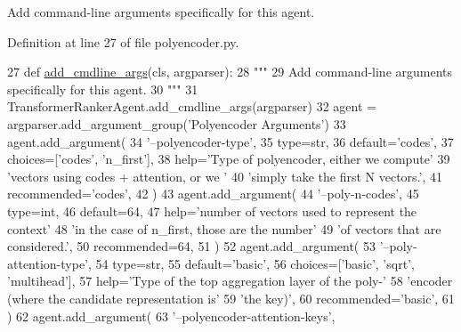 \begin{DoxyVerb}Add command-line arguments specifically for this agent.
\end{DoxyVerb}
 

Definition at line 27 of file polyencoder.\+py.


\begin{DoxyCode}
27     \textcolor{keyword}{def }\hyperlink{namespaceparlai_1_1agents_1_1drqa_1_1config_a62fdd5554f1da6be0cba185271058320}{add\_cmdline\_args}(cls, argparser):
28         \textcolor{stringliteral}{"""}
29 \textcolor{stringliteral}{        Add command-line arguments specifically for this agent.}
30 \textcolor{stringliteral}{        """}
31         TransformerRankerAgent.add\_cmdline\_args(argparser)
32         agent = argparser.add\_argument\_group(\textcolor{stringliteral}{'Polyencoder Arguments'})
33         agent.add\_argument(
34             \textcolor{stringliteral}{'--polyencoder-type'},
35             type=str,
36             default=\textcolor{stringliteral}{'codes'},
37             choices=[\textcolor{stringliteral}{'codes'}, \textcolor{stringliteral}{'n\_first'}],
38             help=\textcolor{stringliteral}{'Type of polyencoder, either we compute'}
39             \textcolor{stringliteral}{'vectors using codes + attention, or we '}
40             \textcolor{stringliteral}{'simply take the first N vectors.'},
41             recommended=\textcolor{stringliteral}{'codes'},
42         )
43         agent.add\_argument(
44             \textcolor{stringliteral}{'--poly-n-codes'},
45             type=int,
46             default=64,
47             help=\textcolor{stringliteral}{'number of vectors used to represent the context'}
48             \textcolor{stringliteral}{'in the case of n\_first, those are the number'}
49             \textcolor{stringliteral}{'of vectors that are considered.'},
50             recommended=64,
51         )
52         agent.add\_argument(
53             \textcolor{stringliteral}{'--poly-attention-type'},
54             type=str,
55             default=\textcolor{stringliteral}{'basic'},
56             choices=[\textcolor{stringliteral}{'basic'}, \textcolor{stringliteral}{'sqrt'}, \textcolor{stringliteral}{'multihead'}],
57             help=\textcolor{stringliteral}{'Type of the top aggregation layer of the poly-'}
58             \textcolor{stringliteral}{'encoder (where the candidate representation is'}
59             \textcolor{stringliteral}{'the key)'},
60             recommended=\textcolor{stringliteral}{'basic'},
61         )
62         agent.add\_argument(
63             \textcolor{stringliteral}{'--polyencoder-attention-keys'},

\end{DoxyCode}
